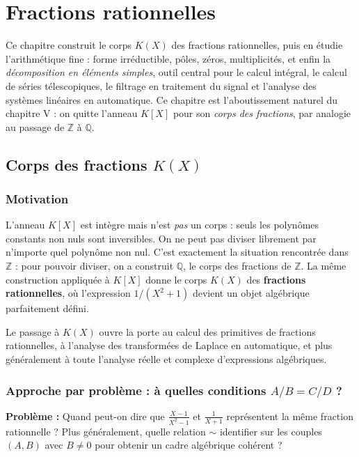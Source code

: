 \chapter{Fractions rationnelles}

Ce chapitre construit le corps $K(X)$ des fractions rationnelles, puis en étudie l'arithmétique fine : forme irréductible, pôles, zéros, multiplicités, et enfin la \emph{décomposition en éléments simples}, outil central pour le calcul intégral, le calcul de séries télescopiques, le filtrage en traitement du signal et l'analyse des systèmes linéaires en automatique. Ce chapitre est l'aboutissement naturel du chapitre V : on quitte l'anneau $K[X]$ pour son \emph{corps des fractions}, par analogie au passage de $\mathbb{Z}$ à $\mathbb{Q}$.

\section{Corps des fractions $K(X)$}

\subsection{Motivation}
L'anneau $K[X]$ est intègre mais n'est \emph{pas} un corps : seuls les polynômes constants non nuls sont inversibles. On ne peut pas diviser librement par n'importe quel polynôme non nul. C'est exactement la situation rencontrée dans $\mathbb{Z}$ : pour pouvoir diviser, on a construit $\mathbb{Q}$, le corps des fractions de $\mathbb{Z}$. La même construction appliquée à $K[X]$ donne le corps $K(X)$ des \textbf{fractions rationnelles}, où l'expression $1/(X^2 + 1)$ devient un objet algébrique parfaitement défini.

Le passage à $K(X)$ ouvre la porte au calcul des primitives de fractions rationnelles, à l'analyse des transformées de Laplace en automatique, et plus généralement à toute l'analyse réelle et complexe d'expressions algébriques.

\subsection{Approche par problème : à quelles conditions $A/B = C/D$ ?}
\textbf{Problème :} Quand peut-on dire que $\frac{X - 1}{X^2 - 1}$ et $\frac{1}{X + 1}$ représentent la même fraction rationnelle ? Plus généralement, quelle relation $\sim$ identifier sur les couples $(A, B)$ avec $B \neq 0$ pour obtenir un cadre algébrique cohérent ?

